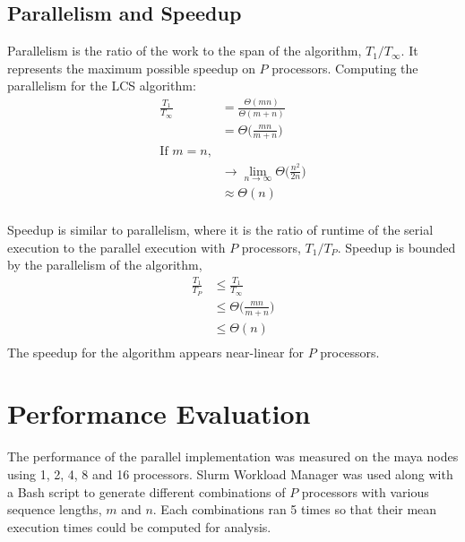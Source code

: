 \documentclass[usletter, 11pt]{extarticle}
\begin{document}
        \subsection{Parallelism and Speedup} Parallelism is the ratio of the
        work to the span of the algorithm, $T_1/T_\infty$. It represents the
        maximum possible speedup on $P$ processors. Computing the parallelism
        for the LCS algorithm:
        \begin{equation*}
            \begin{split}
                \frac{T_1}{T_\infty} & = \frac{\Theta(mn)}{\Theta(m+n)} \\
                & = \Theta\Bigg(\frac{mn}{m+n}\Bigg) \\
                \text{If $m = n$,} & \\
                & \rightarrow \lim_{n\to\infty} \Theta\Bigg(\frac{n^2}{2n}\Bigg) \\
                & \approx \Theta(n) \\
            \end{split}
        \end{equation*}

        Speedup is similar to parallelism, where it is the ratio of runtime of
        the serial execution to the parallel execution with $P$ processors,
        $T_1/T_P$. Speedup is bounded by the parallelism of the algorithm,
        \begin{equation*}
            \begin{split}
                \frac{T_1}{T_P} & \le \frac{T_1}{T_\infty} \\
                & \le \Theta\Bigg(\frac{mn}{m+n}\Bigg) \\
                & \le \Theta(n) \\
            \end{split}
        \end{equation*}
        The speedup for the algorithm appears near-linear for $P$ processors.

    \section{Performance Evaluation} The performance of the parallel
    implementation was measured on the maya nodes using 1, 2, 4, 8 and 16
    processors. Slurm Workload Manager was used along with a Bash script to
    generate different combinations of $P$ processors with various sequence
    lengths, $m$ and $n$. Each combinations ran 5 times so that their mean
    execution times could be computed for analysis.
\end{document}
